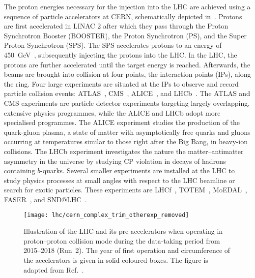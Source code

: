 The proton energies necessary for the injection into the LHC are achieved using
a sequence of particle accelerators at CERN, schematically depicted
in~. Protons are first accelerated in LINAC 2
after which they pass through the Proton Synchrotron Booster (BOOSTER), the
Proton Synchrotron (PS), and the Super Proton Synchrotron (SPS). The SPS
accelerates protons to an energy of \SI{450}{\GeV}~\cite{Evans:2008zzb},
subsequently injecting the protons into the LHC. In the LHC, the protons are
further accelerated until the target energy is reached. Afterwards, the beams
are brought into collision at four points, the interaction points (IPs), along
the ring. Four large experiments are situated at the IPs to observe and record
particle collision events: ATLAS~\cite{PERF-2007-01}, CMS~\cite{CMS-CMS-00-001},
ALICE~\cite{ALICE:2008ngc}, and LHCb~\cite{LHCb:2008vvz}. The ATLAS and CMS
experiments are particle detector experiments targeting largely overlapping,
extensive physics programmes, while the ALICE and LHCb adopt more specialised
programmes. The ALICE experiment studies the production of the quark-gluon
plasma, a state of matter with asymptotically free quarks and gluons occurring
at temperatures similar to those right after the Big Bang, in heavy-ion
collisions. The LHCb experiment investigates the nature the matter--antimatter
asymmetry in the universe by studying CP violation in decays of hadrons
containing $b$-quarks. Several smaller experiments are installed at the LHC to
study physics processes at small angles with respect to the LHC beamline or
search for exotic particles. These experiments are LHCf~\cite{LHCf:2008lfy},
TOTEM~\cite{TOTEM:2008lue}, MoEDAL~\cite{MoEDAL:2009jwa},
FASER~\cite{FASER:2019aik}, and SND@LHC~\cite{Boyarsky:2021moj}.

\begin{figure}[htbp]
  \centering

  \texttt{[image: lhc/cern\_complex\_trim\_otherexp\_removed]}

  \caption[Illustration of the LHC and its pre-accelerators.]{Illustration of
    the LHC and its pre-accelerators when operating in proton--proton collision
    mode during the data-taking period from 2015--2018 (Run~2). The year of
    first operation and circumference of the accelerators is given in solid
    coloured boxes. The figure is adapted from Ref.~\cite{Mobs:2684277}.}%
  \label{fig:cern_accelerator_complex}
\end{figure}

